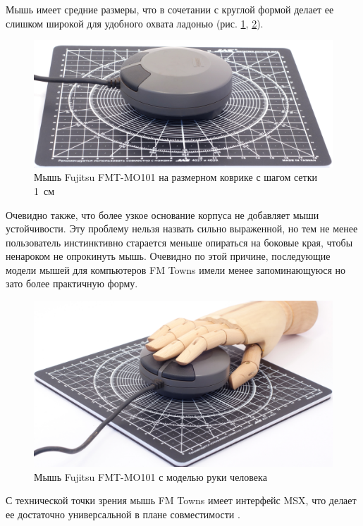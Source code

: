 \documentclass[11pt, a4paper]{article}
\begin{document}
Мышь имеет средние размеры, что в сочетании с круглой формой делает ее слишком широкой \cite{twinklemagic} для удобного охвата ладонью (рис. \ref{fig:FMT1Size}, \ref{fig:FMT1Hand}).

\begin{figure}[h]
    \centering
    \includegraphics[scale=0.45]{1989_fujitsu_fmt_mo101_mouse/size_30.jpg}
    \caption{Мышь Fujitsu FMT-MO101 на размерном коврике с шагом сетки 1~см}
    \label{fig:FMT1Size}
\end{figure}

Очевидно также, что более узкое основание корпуса не добавляет мыши устойчивости. Эту проблему нельзя назвать сильно выраженной, но тем не менее пользователь инстинктивно старается меньше опираться на боковые края, чтобы ненароком не опрокинуть мышь. Очевидно по этой причине, последующие модели мышей для компьютеров FM Towns имели менее запоминающуюся но зато более практичную форму.

\begin{figure}[h]
    \centering
    \includegraphics[scale=0.45]{1989_fujitsu_fmt_mo101_mouse/hand_30.jpg}
    \caption{Мышь Fujitsu FMT-MO101 с моделью руки человека}
    \label{fig:FMT1Hand}
\end{figure}

С технической точки зрения мышь FM Towns имеет интерфейс MSX, что делает ее достаточно универсальной в плане совместимости \cite{tepatti}.
\end{document}
